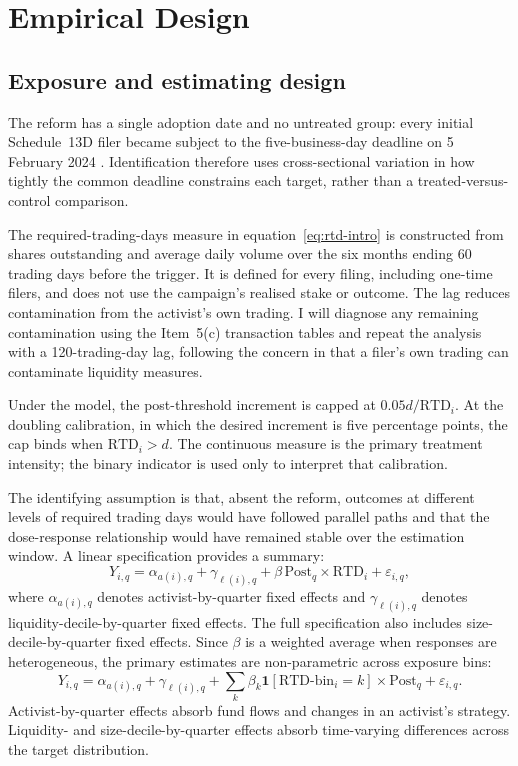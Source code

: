 \section{Empirical Design}
\label{sec:empirics}

\subsection{Exposure and estimating design}
\label{sec:empirical-design}

The reform has a single adoption date and no untreated group: every initial
Schedule~13D filer became subject to the five-business-day deadline on
5 February 2024 \parencite{sec2023modernization}. Identification therefore uses
cross-sectional variation in how tightly the common deadline constrains each
target, rather than a treated-versus-control comparison.

The required-trading-days measure in equation~\eqref{eq:rtd-intro} is constructed
from shares outstanding and average daily volume over the six months ending
60 trading days before the trigger. It is defined for every filing, including
one-time filers, and does not use the campaign's realised stake or outcome. The
lag reduces contamination from the activist's own trading. I will diagnose any
remaining contamination using the Item~5(c) transaction tables and repeat the
analysis with a 120-trading-day lag, following the concern in
\textcite{collindufresnefos2015} that a filer's own trading can contaminate
liquidity measures.

Under the model, the post-threshold increment is capped at
$0.05d/\mathrm{RTD}_i$. At the doubling calibration, in which the desired
increment is five percentage points, the cap binds when
$\mathrm{RTD}_i>d$. The continuous measure is the primary treatment intensity;
the binary indicator is used only to interpret that calibration.

The identifying assumption is that, absent the reform, outcomes at different
levels of required trading days would have followed parallel paths and that the
dose-response relationship would have remained stable over the estimation
window. A linear specification provides a summary:
\begin{equation}
Y_{i,q}
=\alpha_{a(i),q}+\gamma_{\ell(i),q}
+\beta\,\text{Post}_q\times\mathrm{RTD}_i+\varepsilon_{i,q},
\label{eq:dose-linear}
\end{equation}
where $\alpha_{a(i),q}$ denotes activist-by-quarter fixed effects and
$\gamma_{\ell(i),q}$ denotes liquidity-decile-by-quarter fixed effects. The
full specification also includes size-decile-by-quarter fixed effects. Since
$\beta$ is a weighted average when responses are heterogeneous, the primary
estimates are non-parametric across exposure bins:
\begin{equation}
Y_{i,q}
=\alpha_{a(i),q}+\gamma_{\ell(i),q}
+\sum_k\beta_k\mathbf{1}[\text{RTD-bin}_i=k]\times\text{Post}_q
+\varepsilon_{i,q}.
\label{eq:dose-bins}
\end{equation}
Activist-by-quarter effects absorb fund flows and changes in an activist's
strategy. Liquidity- and size-decile-by-quarter effects absorb time-varying
differences across the target distribution.

